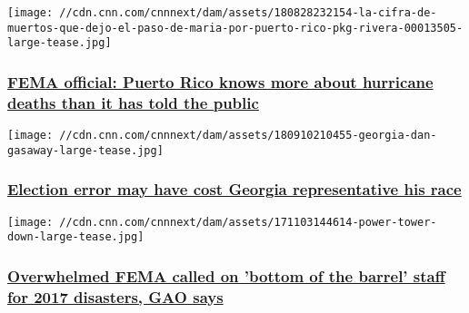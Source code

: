 \href{/2018/09/11/health/fema-funeral-benefits-puerto-rico/index.html}{}

\texttt{[image: //cdn.cnn.com/cnnnext/dam/assets/180828232154-la-cifra-de-muertos-que-dejo-el-paso-de-maria-por-puerto-rico-pkg-rivera-00013505-large-tease.jpg]}

\hypertarget{fema-official-puerto-rico-knows-more-about-hurricane-deaths-than-it-has-told-the-public}{%
\subsubsection{\texorpdfstring{\href{/2018/09/11/health/fema-funeral-benefits-puerto-rico/index.html}{FEMA
official: Puerto Rico knows more about hurricane deaths than it has told
the
public}}{FEMA official: Puerto Rico knows more about hurricane deaths than it has told the public}}\label{fema-official-puerto-rico-knows-more-about-hurricane-deaths-than-it-has-told-the-public}}

\href{/2018/09/10/politics/georgia-election-ballot-error-dan-gasaway-district-legislature-habersham-county/index.html}{}

\texttt{[image: //cdn.cnn.com/cnnnext/dam/assets/180910210455-georgia-dan-gasaway-large-tease.jpg]}

\hypertarget{election-error-may-have-cost-georgia-representative-his-race}{%
\subsubsection{\texorpdfstring{\href{/2018/09/10/politics/georgia-election-ballot-error-dan-gasaway-district-legislature-habersham-county/index.html}{Election
error may have cost Georgia representative his
race}}{Election error may have cost Georgia representative his race}}\label{election-error-may-have-cost-georgia-representative-his-race}}

\href{/2018/09/04/politics/gao-2017-disasters/index.html}{}

\texttt{[image: //cdn.cnn.com/cnnnext/dam/assets/171103144614-power-tower-down-large-tease.jpg]}

\hypertarget{overwhelmed-fema-called-on-bottom-of-the-barrel-staff-for-2017-disasters-gao-says}{%
\subsubsection{\texorpdfstring{\href{/2018/09/04/politics/gao-2017-disasters/index.html}{Overwhelmed
FEMA called on 'bottom of the barrel' staff for 2017 disasters, GAO
says}}{Overwhelmed FEMA called on 'bottom of the barrel' staff for 2017 disasters, GAO says}}\label{overwhelmed-fema-called-on-bottom-of-the-barrel-staff-for-2017-disasters-gao-says}}

